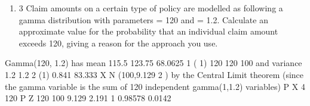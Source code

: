 \documentclass[a4paper,12pt]{article}
\begin{document}

\begin{enumerate}

\item 
3 Claim amounts on a certain type of policy are modelled as following a gamma
distribution with parameters = 120 and = 1.2.
Calculate an approximate value for the probability that an individual claim amount
exceeds 120, giving a reason for the approach you use.

\end{enumerate}
Gamma(120, 1.2) has mean
115.5 123.75
68.0625
1
( 1)
120
120
100 and variance
1.2
1.2 2
(1) 0.841
83.333
X N (100,9.129 2 ) by the Central Limit theorem (since the gamma variable is the
sum of 120 independent gamma(1,1.2) variables)
P X
4
120
P Z
120 100
9.129
2.191
1 0.98578 0.0142
\end{document}
